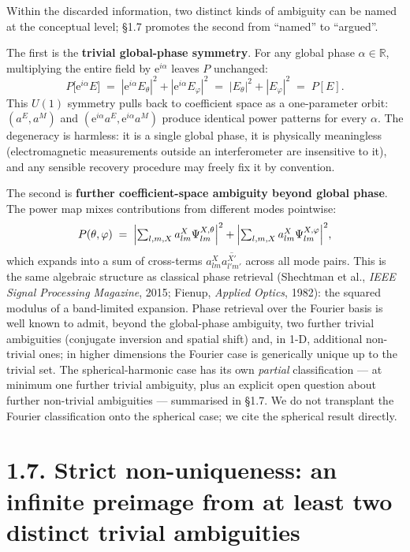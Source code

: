 \documentclass[
  english,
  11pt,
]{report}
\begin{document}
Within the discarded information, two distinct kinds of ambiguity can be
named at the conceptual level; §1.7 promotes the second from ``named''
to ``argued''.

The first is the \textbf{trivial global-phase symmetry}. For any global
phase \(\alpha\in\mathbb{R}\), multiplying the entire field by
\(\mathrm{e}^{i\alpha}\) leaves \(P\) unchanged: \[
P\bigl[\mathrm{e}^{i\alpha} E\bigr] \;=\; |\mathrm{e}^{i\alpha}E_\theta|^2 + |\mathrm{e}^{i\alpha}E_\varphi|^2 \;=\; |E_\theta|^2 + |E_\varphi|^2 \;=\; P[E].
\] This \(U(1)\) symmetry pulls back to coefficient space as a
one-parameter orbit: \((a^E, a^M)\) and
\((\mathrm{e}^{i\alpha}a^E, \mathrm{e}^{i\alpha}a^M)\) produce identical
power patterns for every \(\alpha\). The degeneracy is harmless: it is a
single global phase, it is physically meaningless (electromagnetic
measurements outside an interferometer are insensitive to it), and any
sensible recovery procedure may freely fix it by convention.

The second is \textbf{further coefficient-space ambiguity beyond global
phase}. The power map mixes contributions from different modes
pointwise: \[
P(\theta,\varphi) \;=\; \Bigl|\textstyle\sum_{l,m,X} a^X_{lm}\Psi^{X,\theta}_{lm}\Bigr|^2 + \Bigl|\textstyle\sum_{l,m,X} a^X_{lm}\Psi^{X,\varphi}_{lm}\Bigr|^2,
\] which expands into a sum of cross-terms
\(a^X_{lm}\overline{a^{X'}_{l'm'}}\) across all mode pairs. This is the
same algebraic structure as classical phase retrieval (Shechtman et al.,
\emph{IEEE Signal Processing Magazine}, 2015; Fienup, \emph{Applied
Optics}, 1982): the squared modulus of a band-limited expansion. Phase
retrieval over the Fourier basis is well known to admit, beyond the
global-phase ambiguity, two further trivial ambiguities (conjugate
inversion and spatial shift) and, in 1-D, additional non-trivial ones;
in higher dimensions the Fourier case is generically unique up to the
trivial set. The spherical-harmonic case has its own \emph{partial}
classification --- at minimum one further trivial ambiguity, plus an
explicit open question about further non-trivial ambiguities ---
summarised in §1.7. We do not transplant the Fourier classification onto
the spherical case; we cite the spherical result directly.

\section{1.7. Strict non-uniqueness: an infinite preimage from at least
two distinct trivial
ambiguities}\label{strict-non-uniqueness-an-infinite-preimage-from-at-least-two-distinct-trivial-ambiguities}
\end{document}
